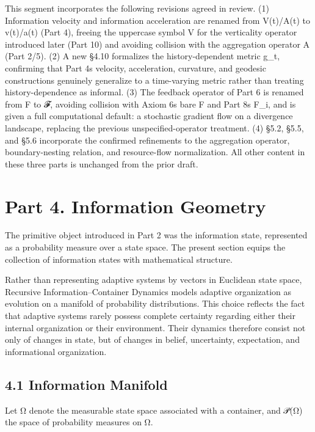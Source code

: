 \documentclass[
]{article}
\begin{document}
This segment incorporates the following revisions agreed in review. (1)
Information velocity and information acceleration are renamed from
V(t)/A(t) to v(t)/a(t) (Part 4), freeing the uppercase symbol V for the
verticality operator introduced later (Part 10) and avoiding collision
with the aggregation operator A (Part 2/5). (2) A new §4.10 formalizes
the history-dependent metric g\_t, confirming that Part
4\textquotesingle s velocity, acceleration, curvature, and geodesic
constructions genuinely generalize to a time-varying metric rather than
treating history-dependence as informal. (3) The feedback operator of
Part 6 is renamed from F to 𝓕, avoiding collision with Axiom
6\textquotesingle s bare F and Part 8\textquotesingle s F\_i, and is
given a full computational default: a stochastic gradient flow on a
divergence landscape, replacing the previous unspecified-operator
treatment. (4) §5.2, §5.5, and §5.6 incorporate the confirmed
refinements to the aggregation operator, boundary-nesting relation, and
resource-flow normalization. All other content in these three parts is
unchanged from the prior draft.

\hypertarget{part-4.-information-geometry}{%
\section{Part 4. Information
Geometry}\label{part-4.-information-geometry}}

The primitive object introduced in Part 2 was the information state,
represented as a probability measure over a state space. The present
section equips the collection of information states with mathematical
structure.

Rather than representing adaptive systems by vectors in Euclidean state
space, Recursive Information--Container Dynamics models adaptive
organization as evolution on a manifold of probability distributions.
This choice reflects the fact that adaptive systems rarely possess
complete certainty regarding either their internal organization or their
environment. Their dynamics therefore consist not only of changes in
state, but of changes in belief, uncertainty, expectation, and
informational organization.

\hypertarget{information-manifold}{%
\subsection{4.1 Information Manifold}\label{information-manifold}}

Let Ω denote the measurable state space associated with a container, and
𝒫(Ω) the space of probability measures on Ω.
\end{document}
